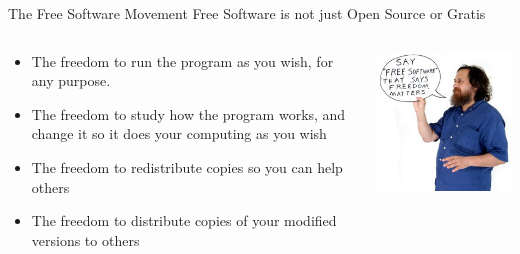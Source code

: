 \documentclass[unknownkeysallowed, 10pt, a4 paper, handout]{beamer}
\begin{document}
\begin{frame}[label=gnu]{The Free Software Movement}
  Free Software is not just Open Source or Gratis %
  \begin{columns}[T]
    \begin{column}{.65\textwidth}
      \begin{itemize}
        \item The freedom to run the program as you wish, for any purpose.
        \item The freedom to study how the program works, and change it so it
          does your computing as you wish
        \item The freedom to redistribute copies so you can help others
        \item The freedom to distribute copies of your modified versions
          to others
      \end{itemize}
    \end{column}
    \hfill
    \begin{column}{.32\textwidth}
      \includegraphics[scale=0.45]{pics/rms1.png}
    \end{column}
  \end{columns}
\end{frame}
\end{document}

